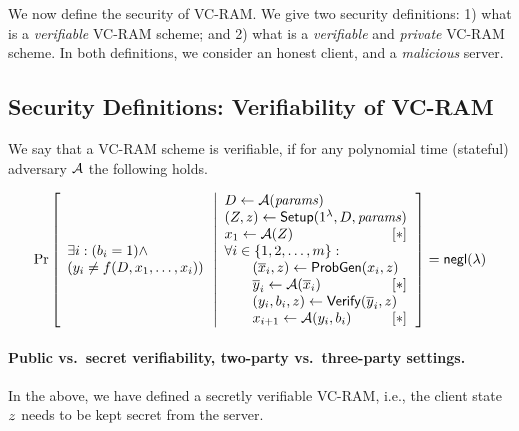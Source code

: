 We now define the security of VC-RAM.
We give two security definitions:
1) what is a {\it verifiable} VC-RAM scheme; and 2) what is
a {\it verifiable} and {\it private} VC-RAM scheme.
In both definitions, we
consider an honest client, and a {\it malicious} server.



\subsection{Security Definitions: Verifiability of VC-RAM}
\label{sec:defn-verifiability}

\begin{definition}
We say that a VC-RAM scheme is verifiable, if
for any polynomial time (stateful) adversary $\mathcal{A}$ the following holds.
\label{defn:verifiable}
\end{definition}
\[
\Pr\left[
\begin{array}{l}
\exists i: (b_i = 1) \wedge   \\
(\res_i \neq f(D, \inp_1, \ldots, \inp_i) )
\end{array}
\left|
\begin{array}{l}
D \leftarrow \algA(\params)\\
(\sst, \cst) \leftarrow \algSetup(1^\lambda, D, \params) \\
\inp_1 \leftarrow \algA(\sst) \hfill [*]\\
\forall i \in  \{1, 2, \ldots, m\}: \\
\quad \quad (\overline{\inp}_i, \cst) \leftarrow \algProbgen(\inp_i, \cst)\\
\quad \quad \overline{\res}_i \leftarrow \algA(\overline{\inp}_i) \hfill [*]\\
\quad \quad (\res_i, b_i, \cst) \leftarrow \algVerify(\overline{\res}_i, \cst) \\
\quad \quad \inp_{i+1} \leftarrow \algA(\res_i, b_i) \hfill [*]
\end{array}
\right.
\right]
= \mathsf{negl}(\lambda)
\]

\paragraph{Public vs.\ secret verifiability, two-party vs.\ three-party settings.}
In the above, we have defined a secretly verifiable VC-RAM, i.e.,
the client state $z$ needs to be kept secret from the server.

